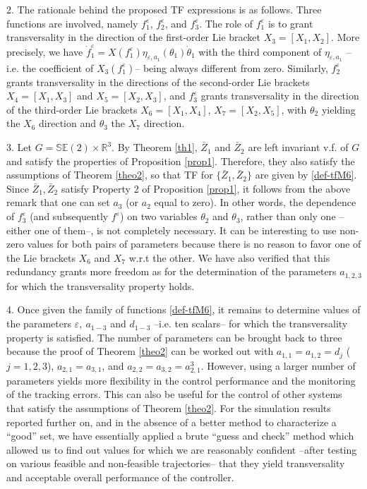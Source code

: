 \documentclass[a4paper,twoside]{article}
\def \RR {{\mathbb R}}
\def \eps {\varepsilon}
\def \SE {{\mathbb S}{\mathbb E}}
\begin{document}
2. The rationale behind the proposed TF expressions is as follows. Three functions are involved, namely 
$f_1^\eps$, $f_2^\eps$, and $f_3^\eps$. The role of $f_1^\eps$ is to grant
transversality in the direction of the first-order Lie bracket $X_3=[X_1,X_2]$. More precisely, we have
$\dot f_1^\eps = X(f_1^\eps) \eta_{\eps,a_1}(\theta_1) \dot \theta_1$ with the third component of 
$ \eta_{\eps,a_1}$ --i.e. the coefficient of $X_3(f_1^\eps)$-- being always different from zero. Similarly, $f_2^\eps$ grants  
transversality in the directions of the second-order Lie brackets $X_4=[X_1,X_3]$ and 
$X_5=[X_2,X_3]$, and $f_3^\eps$ grants 
transversality in the direction of the third-order Lie brackets $X_6=[X_1,X_4]$, $X_7=[X_2,X_5]$, 
with $\theta_2$ yielding the
$X_6$ direction and $\theta_3$ the $X_7$ direction.

3. Let  $G=\SE(2) \times \RR^3$. By Theorem \ref{th1}, $\bar Z_1$ and $\bar Z_2$ are left invariant v.f. of $G$ and satisfy the  
properties of Proposition \ref{prop1}. Therefore, they also satisfy the assumptions of Theorem \ref{theo2}, so that TF
for  $\{\bar Z_1, \bar Z_2\}$ are given by \eqref{def-tfM6}. Since $\bar Z_1, \bar Z_2$ satisfy Property 2 of Proposition \ref{prop1}, 
it follows from the above remark that one can set $a_3$ (or $a_2$ equal to zero). In other words, the dependence of $f_3^\eps$ 
(and subsequently $f^\eps$) on two 
variables $\theta_2$ and $\theta_3$, rather than only one --either one of them--,  is not completely necessary. 
It can be interesting  to use non-zero values for both pairs of parameters because there is no 
reason to favor one of the Lie brackets $X_6$ and $X_7$ w.r.t the other. We have also verified that this redundancy
grants more freedom as for the determination of the parameters $a_{1,2,3}$ for which the transversality property holds.   

4. Once given the family of functions \eqref{def-tfM6}, it remains to determine values of the parameters 
$\eps,~a_{1-3}$ and $d_{1-3}$ --i.e. ten scalars-- for which the transversality property is satisfied. The number of 
parameters can be brought back to three because the proof of Theorem \ref{theo2} can be worked out with 
$a_{1,1}=a_{1,2}= d_j$ ($j=1,2,3$), $a_{2,1}=a_{3,1}$, and $a_{2,2}=a_{3,2}= a_{2,1}^3$. However, using a larger number 
of parameters yields more flexibility in the control 
performance and the monitoring of the tracking errors. This can also be useful for the control of other systems 
that satisfy the 
assumptions of Theorem \ref{theo2}. For the simulation results reported further on, and in the absence of a better method to characterize a ``good'' set, we have essentially applied a brute ``guess and check'' method which allowed us to find out values for which we are reasonably confident --after testing on various feasible and non-feasible trajectories-- that they yield transversality and acceptable overall performance of the controller.
\end{document}
